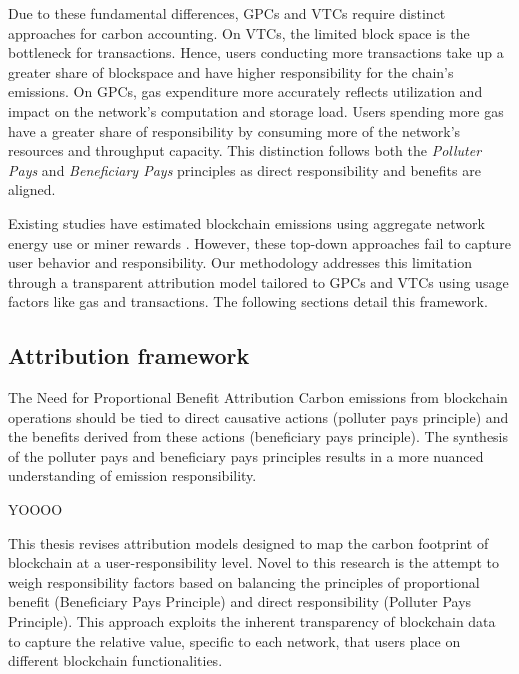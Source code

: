 \documentclass[11pt]{report}
\begin{document}
Due to these fundamental differences, GPCs and VTCs require distinct approaches for carbon accounting. On VTCs, the limited block space is the bottleneck for transactions. Hence, users conducting more transactions take up a greater share of blockspace and have higher responsibility for the chain's emissions. On GPCs, gas expenditure more accurately reflects utilization and impact on the network's computation and storage load. Users spending more gas have a greater share of responsibility by consuming more of the network's resources and throughput capacity. This distinction follows both the \textit{Polluter Pays} and \textit{Beneficiary Pays} principles as direct responsibility and benefits are aligned.

Existing studies have estimated blockchain emissions using aggregate network energy use or miner rewards \cite{devriesCryptocurrenciesRoadSustainability2022,devriesRevisitingBitcoinCarbon2022,neumuellerCambridgeBitcoinElectricity2021,mcdonaldEthereumEmissionsBottomup2022}. However, these top-down approaches fail to capture user behavior and responsibility. Our methodology addresses this limitation through a transparent attribution model tailored to GPCs and VTCs using usage factors like gas and transactions. The following sections detail this framework.

\subsection{Attribution framework}
The Need for Proportional Benefit Attribution
Carbon emissions from blockchain operations should be tied to direct causative actions (polluter pays principle) and the benefits derived from these actions (beneficiary pays principle). The synthesis of the polluter pays and beneficiary pays principles results in a more nuanced understanding of emission responsibility.

    {\large{YOOOO}}

This thesis revises attribution models designed to map the carbon footprint of blockchain at a user-responsibility level. Novel to this research is the attempt to weigh responsibility factors based on balancing the principles of proportional benefit (Beneficiary Pays Principle) and direct responsibility (Polluter Pays Principle). This approach exploits the inherent transparency of blockchain data to capture the relative value, specific to each network, that users place on different blockchain functionalities.
\end{document}
